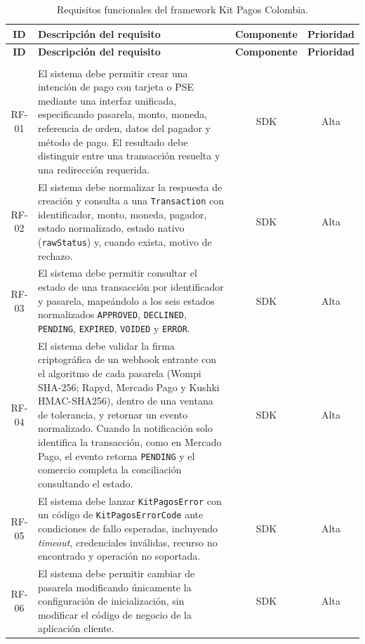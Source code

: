 \begin{center}
\renewcommand{\arraystretch}{1.2}
\begin{longtable}{|c|p{8.1cm}|c|c|}
  \hline
  \textbf{ID} & \textbf{Descripción del requisito} & \textbf{Componente} & \textbf{Prioridad} \\
  \hline
  \endfirsthead
  \hline
  \textbf{ID} & \textbf{Descripción del requisito} & \textbf{Componente} & \textbf{Prioridad} \\
  \hline
  \endhead
  \hline
  \endfoot
  \hline
  \caption{Requisitos funcionales del framework Kit Pagos Colombia.}
  \label{tab:requisitos-funcionales}\\
  \endlastfoot
  RF-01 & El sistema debe permitir crear una intención de pago con tarjeta o PSE mediante una interfaz unificada, especificando pasarela, monto, moneda, referencia de orden, datos del pagador y método de pago. El resultado debe distinguir entre una transacción resuelta y una redirección requerida. & SDK & Alta \\
  \hline
  RF-02 & El sistema debe normalizar la respuesta de creación y consulta a una \texttt{Transaction} con identificador, monto, moneda, pagador, estado normalizado, estado nativo (\texttt{rawStatus}) y, cuando exista, motivo de rechazo. & SDK & Alta \\
  \hline
  RF-03 & El sistema debe permitir consultar el estado de una transacción por identificador y pasarela, mapeándolo a los seis estados normalizados \texttt{APPROVED}, \texttt{DECLINED}, \texttt{PENDING}, \texttt{EXPIRED}, \texttt{VOIDED} y \texttt{ERROR}. & SDK & Alta \\
  \hline
  RF-04 & El sistema debe validar la firma criptográfica de un webhook entrante con el algoritmo de cada pasarela (Wompi SHA-256; Rapyd, Mercado Pago y Kushki HMAC-SHA256), dentro de una ventana de tolerancia, y retornar un evento normalizado. Cuando la notificación solo identifica la transacción, como en Mercado Pago, el evento retorna \texttt{PENDING} y el comercio completa la conciliación consultando el estado. & SDK & Alta \\
  \hline
  RF-05 & El sistema debe lanzar \texttt{KitPagosError} con un código de \texttt{KitPagosErrorCode} ante condiciones de fallo esperadas, incluyendo \textit{timeout}, credenciales inválidas, recurso no encontrado y operación no soportada. & SDK & Alta \\
  \hline
  RF-06 & El sistema debe permitir cambiar de pasarela modificando únicamente la configuración de inicialización, sin modificar el código de negocio de la aplicación cliente. & SDK & Alta \\

\end{longtable}
\end{center}
